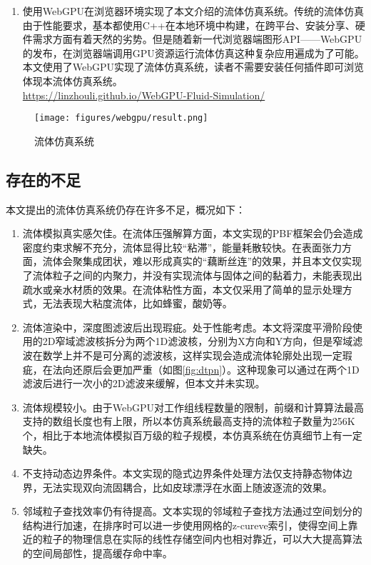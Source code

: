 \begin{enumerate}
    	\item 使用WebGPU在浏览器环境实现了本文介绍的流体仿真系统。传统的流体仿真由于性能要求，基本都使用C++在本地环境中构建，在跨平台、安装分享、硬件需求方面有着天然的劣势。但是随着新一代浏览器端图形API——WebGPU的发布，在浏览器端调用GPU资源运行流体仿真这种复杂应用遍成为了可能。本文使用了WebGPU实现了流体仿真系统，读者不需要安装任何插件即可浏览体现本流体仿真系统。 
    \\
    \href{https://linzhouli.github.io/WebGPU-Fluid-Simulation/}{https://linzhouli.github.io/WebGPU-Fluid-Simulation/}
    \end{enumerate}

    \begin{figure}[htbp]
    	\centering
    	\texttt{[image: figures/webgpu/result.png]}
    	\caption{流体仿真系统}
    \end{figure}

\subsection{存在的不足}
    本文提出的流体仿真系统仍存在许多不足，概况如下：
    
    \begin{enumerate}
    	\item 流体模拟真实感欠佳。在流体压强解算方面，本文实现的PBF框架会仍会造成密度约束求解不充分，流体显得比较“粘滞”，能量耗散较快。在表面张力方面，流体会聚集成团状，难以形成真实的“藕断丝连”的效果，并且本文仅实现了流体粒子之间的内聚力，并没有实现流体与固体之间的黏着力，未能表现出疏水或亲水材质的效果。在流体粘性方面，本文仅采用了简单的显示处理方式，无法表现大粘度流体，比如蜂蜜，酸奶等。
    	\item 流体渲染中，深度图滤波后出现瑕疵。处于性能考虑。本文将深度平滑阶段使用的2D窄域滤波核拆分为两个1D滤波核，分别为X方向和Y方向，但是窄域滤波在数学上并不是可分离的滤波核，这样实现会造成流体轮廓处出现一定瑕疵，在法向还原后会更加严重（如图\ref{fig:dtpn}）。这种现象可以通过在两个1D滤波后进行一次小的2D滤波来缓解，但本文并未实现。
    	\item 流体规模较小。由于WebGPU对工作组线程数量的限制，前缀和计算算法最高支持的数组长度也有上限，所以本仿真系统最高支持的流体粒子数量为256K个，相比于本地流体模拟百万级的粒子规模，本仿真系统在仿真细节上有一定缺失。
    	\item 不支持动态边界条件。本文实现的隐式边界条件处理方法仅支持静态物体边界，无法实现双向流固耦合，比如皮球漂浮在水面上随波逐流的效果。
    	\item 邻域粒子查找效率仍有待提高。文本实现的邻域粒子查找方法通过空间划分的结构进行加速，在排序时可以进一步使用网格的z-cureve索引，使得空间上靠近的粒子的物理信息在实际的线性存储空间内也相对靠近，可以大大提高算法的空间局部性，提高缓存命中率。
    \end{enumerate}

